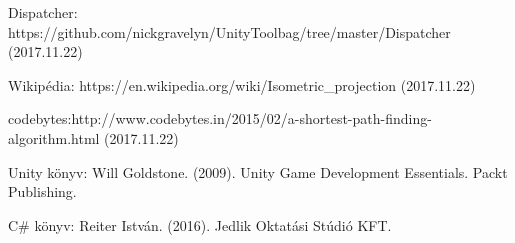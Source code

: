 \begin{thebibliography}{x}
 Dispatcher:\; \newline https://github.com/nickgravelyn/UnityToolbag/tree/master/Dispatcher (2017.11.22)

 Wikipédia: https://en.wikipedia.org/wiki/Isometric\_projection (2017.11.22)

 codebytes:\;http://www.codebytes.in/2015/02/a-shortest-path-finding-algorithm.html (2017.11.22)

 Unity könyv: Will Goldstone. (2009). Unity Game Development Essentials. Packt Publishing.

 C\# könyv: Reiter István. (2016). Jedlik Oktatási Stúdió KFT.



\end{thebibliography}
